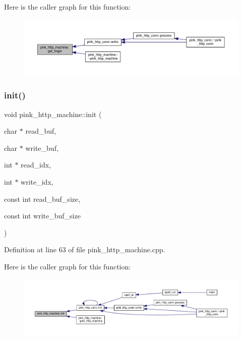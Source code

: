 Here is the caller graph for this function\+:\nopagebreak
\begin{figure}[H]
\begin{center}
\leavevmode
\includegraphics[width=350pt]{classpink__http__machine_a01dcf59a537c21d5a4a92c1c25fbf3ab_icgraph}
\end{center}
\end{figure}
\mbox{\label{classpink__http__machine_a32b0ee47de1b90467d17194fa83b4eb0}} 
\subsubsection{\texorpdfstring{init()}{init()}}
{\footnotesize\ttfamily void pink\+\_\+http\+\_\+machine\+::init (\begin{DoxyParamCaption}\item[{char $\ast$}]{read\+\_\+buf,  }\item[{char $\ast$}]{write\+\_\+buf,  }\item[{int $\ast$}]{read\+\_\+idx,  }\item[{int $\ast$}]{write\+\_\+idx,  }\item[{const int}]{read\+\_\+buf\+\_\+size,  }\item[{const int}]{write\+\_\+buf\+\_\+size }\end{DoxyParamCaption})}



Definition at line 63 of file pink\+\_\+http\+\_\+machine.\+cpp.

Here is the caller graph for this function\+:
\nopagebreak
\begin{figure}[H]
\begin{center}
\leavevmode
\includegraphics[width=350pt]{classpink__http__machine_a32b0ee47de1b90467d17194fa83b4eb0_icgraph}
\end{center}
\end{figure}
\mbox{\label{classpink__http__machine_ad6d404392628f4b2c94a4b30fefb62f8}} 
